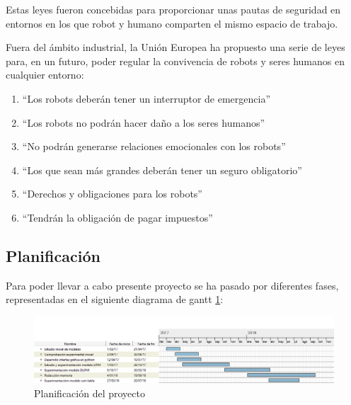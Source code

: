 Estas leyes fueron concebidas para proporcionar unas pautas de seguridad en entornos en los que robot y humano comparten el mismo espacio de trabajo.

Fuera del ámbito industrial, la Unión Europea ha propuesto una serie de leyes para, en un futuro, poder regular la convivencia de robots y seres humanos en cualquier entorno:

\begin{enumerate}

\item ``Los robots deberán tener un interruptor de emergencia''

\item ``Los robots no podrán hacer daño a los seres humanos''

\item ``No podrán generarse relaciones emocionales con los robots''

\item ``Los que sean más grandes deberán tener un seguro obligatorio''

\item ``Derechos y obligaciones para los robots''

\item ``Tendrán la obligación de pagar impuestos''

\end{enumerate}

\newpage

\subsection{Planificación}

Para poder llevar a cabo presente proyecto se ha pasado por diferentes fases, representadas en el siguiente diagrama de gantt \ref{figura2}:

\begin{figure}[H]
\centering
\includegraphics[scale=0.5]{imagenes/apartado_1/12_planificacion_v1}
\caption{Planificación del proyecto}
\label{figura2}
\end{figure}


